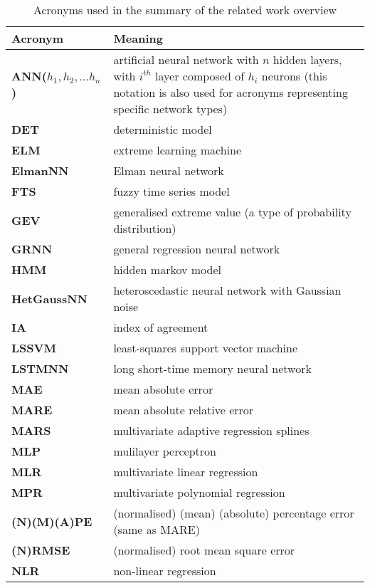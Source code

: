 \begin{table}[ht]
\centering
\caption{Acronyms used in the summary of the related work overview} 
\label{tab:related-work-acronyms}
\begingroup\scriptsize
\begin{tabularx}{\linewidth}{lX}
  \toprule
Acronym & Meaning \\ 
  \midrule
\textbf{ ANN($h_1, h_2, ... h_n$) } &  artificial neural network with $n$ hidden layers, with $i^{th}$ layer composed of $h_i$ neurons (this notation is also used for acronyms representing specific network types) \\ 
  \textbf{ DET } &  deterministic model \\ 
  \textbf{ ELM } &  extreme learning machine \\ 
  \textbf{ ElmanNN } &  Elman neural network \\ 
  \textbf{ FTS } &  fuzzy time series model \\ 
  \textbf{ GEV } &  generalised extreme value (a type of probability distribution) \\ 
  \textbf{ GRNN } &  general regression neural network \\ 
  \textbf{ HMM } &  hidden markov model \\ 
  \textbf{ HetGaussNN } &  heteroscedastic neural network with Gaussian noise \\ 
  \textbf{ IA } &  index of agreement \\ 
  \textbf{ LSSVM } &  least-squares support vector machine \\ 
  \textbf{ LSTMNN } &  long short-time memory neural network \\ 
  \textbf{ MAE } &  mean absolute error \\ 
  \textbf{ MARE } &  mean absolute relative error \\ 
  \textbf{ MARS } &  multivariate adaptive regression splines \\ 
  \textbf{ MLP } &  mulilayer perceptron \\ 
  \textbf{ MLR } &  multivariate linear regression \\ 
  \textbf{ MPR } &  multivariate polynomial regression \\ 
  \textbf{ (N)(M)(A)PE } &  (normalised) (mean) (absolute) percentage error (same as MARE) \\ 
  \textbf{ (N)RMSE } &  (normalised) root mean square error \\ 
  \textbf{ NLR } &  non-linear regression \\ 

\end{tabularx}
\end{table}
